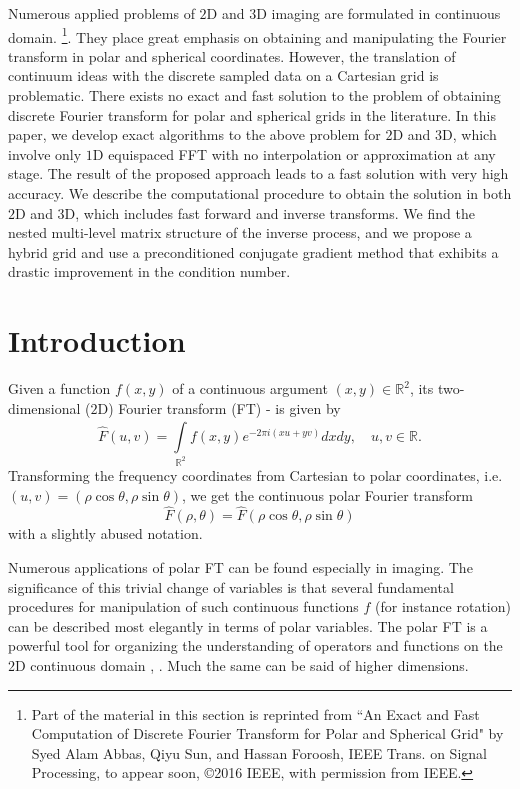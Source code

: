 \documentclass{UCF_ETD}
\begin{document}
Numerous applied problems of $2$D and $3$D imaging are formulated in continuous domain. \footnote{Part of the material in this section is reprinted from ``An Exact and Fast Computation of Discrete Fourier
Transform for Polar and Spherical Grid" by Syed Alam Abbas, Qiyu Sun, and Hassan Foroosh, IEEE Trans. on Signal Processing, to appear soon, \copyright 2016 IEEE, with permission from IEEE.}. They place great emphasis on obtaining and manipulating the Fourier transform in polar and spherical coordinates. However, the translation of continuum ideas  with the discrete  sampled data on a Cartesian grid is problematic. There exists no exact and fast solution to the problem of obtaining discrete Fourier transform for polar and spherical grids in the literature. In this paper, we develop exact algorithms to the above problem for $2$D and $3$D, which  involve only $1$D equispaced FFT with no interpolation or approximation at any stage. The result
   of the proposed approach leads to a fast solution
with very high accuracy. We describe the computational procedure to obtain the solution in both $2$D and $3$D, which includes fast forward and inverse transforms.
We find the nested  multi-level matrix structure of the inverse process, and we propose a hybrid grid and use
a preconditioned conjugate gradient method %
 that exhibits a drastic improvement in the condition number.
 
 \section{Introduction}
Given a function $f(x,y)$ of a continuous argument $(x,y) \in \mathbb{R}^2$, its two-dimensional ($2$D) Fourier transform (FT) \cite{Gray95}-\cite{Notes} is given by
 \begin{equation} \label{ContinuousTime_FourierTransform}
 \hat{F}(u,v) = \int\limits_{\mathbb{R}^2 }^{} f(x,y) e^{-2\pi i (xu+ yv)} dx dy, \quad u,v \in \mathbb{R}.
 \end{equation}
  Transforming the frequency coordinates from Cartesian to polar coordinates,  i.e. $(u,v) = (\rho\cos\theta, \rho\sin \theta)$, we get the continuous polar Fourier transform
 \begin{equation} \label{ContinuousTime_FourierTransformPolar}
 \hat{F}(\rho,\theta) = \hat{F}(\rho\cos\theta,\rho\sin \theta)
 \end{equation}
 with a slightly abused notation.
 
 Numerous applications of polar FT can be found especially in imaging. The significance of this trivial change of variables is that several fundamental procedures for manipulation of such continuous functions $f$ (for instance rotation) can be described most elegantly in terms of polar variables. The polar FT is a powerful tool for organizing the understanding of operators and functions on the $2$D continuous domain \cite{Amir2006}, \cite{Markus2007}. Much the same can be said of higher dimensions.
 
\end{document}
